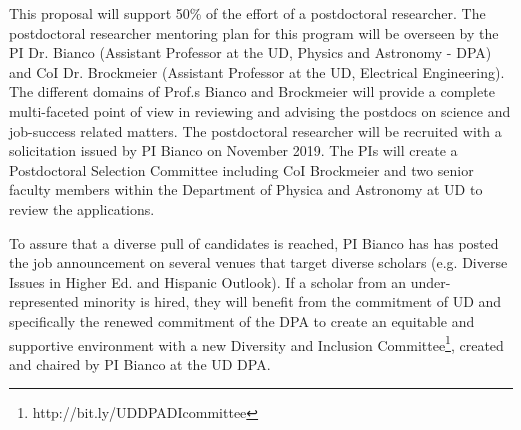 This proposal will support 50\% of the effort of a postdoctoral researcher.  The postdoctoral researcher mentoring plan for this program will be overseen by the PI Dr. Bianco (Assistant Professor at the UD, Physics and Astronomy - DPA) and CoI Dr. Brockmeier (Assistant Professor at the UD, Electrical Engineering).  The different domains of Prof.s Bianco and Brockmeier will provide a complete multi-faceted point of view in reviewing and advising the postdocs on science and job-success related matters. 
The postdoctoral researcher will be recruited with a solicitation issued by PI Bianco on November 2019.  The PIs will create a Postdoctoral Selection Committee including CoI Brockmeier and two senior faculty members within the Department of Physica and Astronomy at UD to review the applications.

To assure that a diverse pull of candidates is reached, PI Bianco has has posted the job announcement on several venues that target diverse scholars (e.g. Diverse Issues in Higher Ed. and Hispanic Outlook).  If a  scholar from an under-represented minority is hired, they will benefit from the commitment of UD and specifically the renewed commitment of the DPA to create an equitable and supportive environment with a new Diversity and Inclusion Committee\footnote{http://bit.ly/UDDPADIcommittee}, created and chaired by PI Bianco at the UD DPA.

